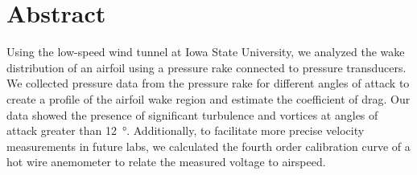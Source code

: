 \thispagestyle{plain} %



\chapter*{Abstract} %
Using the low-speed wind tunnel at Iowa State University, we analyzed the wake distribution of an airfoil using a pressure rake connected to pressure transducers. We collected pressure data from the pressure rake for different angles of attack to create a profile of the airfoil wake region and estimate the coefficient of drag. Our data showed the presence of significant turbulence and vortices at angles of attack greater than \qty{12}{\degree}. Additionally, to facilitate more precise velocity measurements in future labs, we calculated the fourth order calibration curve of a hot wire anemometer to relate the measured voltage to airspeed.



